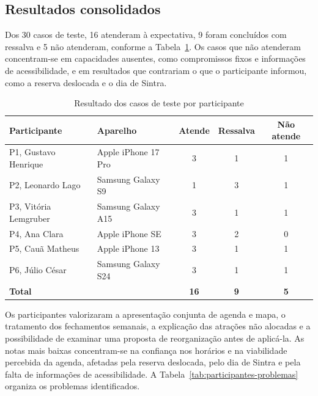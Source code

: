\subsection{Resultados consolidados}

Dos 30 casos de teste, 16 atenderam à expectativa, 9 foram concluídos com ressalva e 5 não atenderam, conforme a Tabela~\ref{tab:participantes-casos}. Os casos que não atenderam concentram-se em capacidades ausentes, como compromissos fixos e informações de acessibilidade, e em resultados que contrariam o que o participante informou, como a reserva deslocada e o dia de Sintra.

\begin{table}[H]
\centering
\small
\caption{Resultado dos casos de teste por participante}
\label{tab:participantes-casos}
\begin{tabular}{llccc}
\hline
\textbf{Participante} & \textbf{Aparelho} & \textbf{Atende} & \textbf{Ressalva} & \textbf{Não atende} \\
\hline
P1, Gustavo Henrique & Apple iPhone 17 Pro & 3 & 1 & 1 \\
P2, Leonardo Lago & Samsung Galaxy S9 & 1 & 3 & 1 \\
P3, Vitória Lemgruber & Samsung Galaxy A15 & 3 & 1 & 1 \\
P4, Ana Clara & Apple iPhone SE & 3 & 2 & 0 \\
P5, Cauã Matheus & Apple iPhone 13 & 3 & 1 & 1 \\
P6, Júlio César & Samsung Galaxy S24 & 3 & 1 & 1 \\
\hline
\textbf{Total} & & \textbf{16} & \textbf{9} & \textbf{5} \\
\hline
\end{tabular}
\end{table}

Os participantes valorizaram a apresentação conjunta de agenda e mapa, o tratamento dos fechamentos semanais, a explicação das atrações não alocadas e a possibilidade de examinar uma proposta de reorganização antes de aplicá-la. As notas mais baixas concentram-se na confiança nos horários e na viabilidade percebida da agenda, afetadas pela reserva deslocada, pelo dia de Sintra e pela falta de informações de acessibilidade. A Tabela~\ref{tab:participantes-problemas} organiza os problemas identificados.

